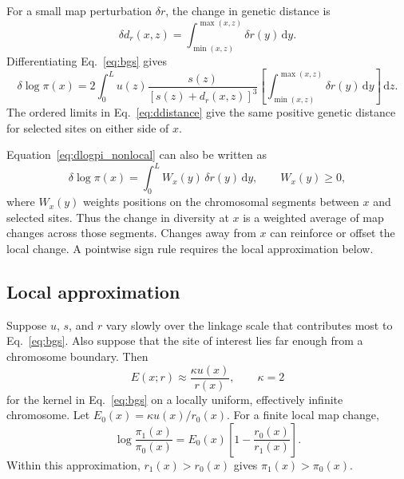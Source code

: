 \documentclass[11pt]{article}
\theoremstyle{remark}
\newcommand{\dd}{\,\mathrm{d}}
\begin{document}
For a small map perturbation $\delta r$, the change in genetic distance is
\begin{equation}
\delta d_r(x,z)
=\int_{\min(x,z)}^{\max(x,z)}\delta r(y)\dd y.
\label{eq:ddistance}
\end{equation}
Differentiating Eq.~\eqref{eq:bgs} gives
\begin{equation}
\boxed{\;
\delta\log\pi(x)
=2\int_0^L u(z)
\frac{s(z)}{\left[s(z)+d_r(x,z)\right]^3}
\left[
\int_{\min(x,z)}^{\max(x,z)}\delta r(y)\dd y
\right]\dd z.
\;}
\label{eq:dlogpi_nonlocal}
\end{equation}
The ordered limits in Eq.~\eqref{eq:ddistance} give the same positive genetic
distance for selected sites on either side of $x$.

Equation~\eqref{eq:dlogpi_nonlocal} can also be written as
\begin{equation}
\delta\log\pi(x)=\int_0^L W_x(y)\,\delta r(y)\dd y,
\qquad W_x(y)\ge 0,
\label{eq:kernel}
\end{equation}
where $W_x(y)$ weights positions on the chromosomal segments between $x$ and
selected sites. Thus the change in diversity at $x$ is a weighted average of map
changes across those segments. Changes away from $x$ can reinforce or offset the
local change. A pointwise sign rule requires the local approximation below.

\subsection{Local approximation}

Suppose $u$, $s$, and $r$ vary slowly over the linkage scale that contributes most
to Eq.~\eqref{eq:bgs}. Also suppose that the site of interest lies far enough from a chromosome
boundary. Then
\begin{equation}
E(x;r)\approx\frac{\kappa u(x)}{r(x)},
\qquad \kappa=2
\label{eq:bgs_local}
\end{equation}
for the kernel in Eq.~\eqref{eq:bgs} on a locally uniform, effectively infinite
chromosome. Let $E_0(x)=\kappa u(x)/r_0(x)$. For a finite local map change,
\begin{equation}
\boxed{\;
\log\frac{\pi_1(x)}{\pi_0(x)}
=E_0(x)\left[1-\frac{r_0(x)}{r_1(x)}\right].
\;}
\label{eq:pi_ratio_general}
\end{equation}
Within this approximation, $r_1(x)>r_0(x)$ gives $\pi_1(x)>\pi_0(x)$.
\end{document}
